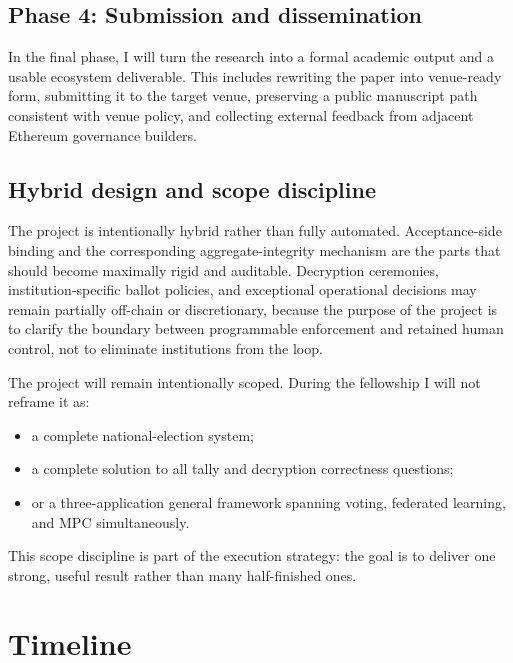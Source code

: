 \documentclass[11pt]{article}
\begin{document}
\subsection{Phase 4: Submission and dissemination}

In the final phase, I will turn the research into a formal academic output and a
usable ecosystem deliverable. This includes rewriting the paper into
venue-ready form, submitting it to the target venue, preserving a public
manuscript path consistent with venue policy, and collecting external feedback
from adjacent Ethereum governance builders.

\subsection{Hybrid design and scope discipline}

The project is intentionally hybrid rather than fully automated. Acceptance-side
binding and the corresponding aggregate-integrity mechanism are the parts that
should become maximally rigid and auditable. Decryption ceremonies,
institution-specific ballot policies, and exceptional operational decisions may
remain partially off-chain or discretionary, because the purpose of the project
is to clarify the boundary between programmable enforcement and retained human
control, not to eliminate institutions from the loop.

The project will remain intentionally scoped. During the fellowship I will not
reframe it as:

\begin{itemize}[leftmargin=*]
\item a complete national-election system;
\item a complete solution to all tally and decryption correctness questions;
\item or a three-application general framework spanning voting, federated
      learning, and MPC simultaneously.
\end{itemize}

This scope discipline is part of the execution strategy: the goal is to deliver
one strong, useful result rather than many half-finished ones.


\section{Timeline}
\end{document}
